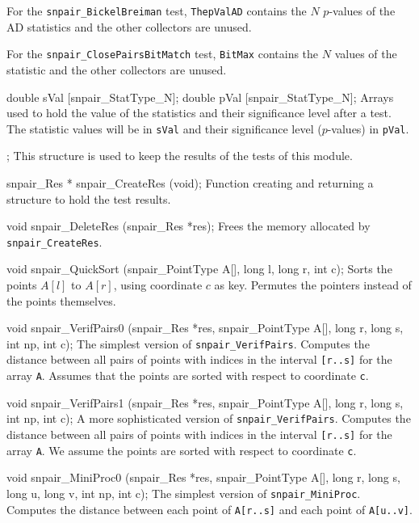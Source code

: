 {  For the {\tt snpair\_BickelBreiman} test, {\tt ThepValAD}
  contains the $N$ $p$-values of the AD statistics and the other
  collectors are unused.

  For the {\tt snpair\_ClosePairsBitMatch} test, {\tt BitMax}
  contains the $N$ values of the statistic and the other
  collectors are unused.
  \endtabb
\code

   double sVal [snpair_StatType_N];
   double pVal [snpair_StatType_N];
\endcode
 \tabb
  Arrays used to hold the value of the
  statistics and their significance level after a test.
  The statistic values will be in
  {\tt sVal} and their significance level
  ($p$-values) in {\tt pVal}.
 \endtabb
\code

};
\endcode
 \tab
  This structure is used to keep the results of
  the tests of this module.
 \endtab
\code


snpair_Res * snpair_CreateRes (void);
\endcode
 \tab
  Function creating and returning a structure to hold the test results.
 \endtab
\code


void snpair_DeleteRes (snpair_Res *res);
\endcode
 \tab
  Frees the memory allocated by {\tt snpair\_CreateRes}.
 \endtab
\fi
\hide  %

\code

void snpair_QuickSort (snpair_PointType A[], long l, long r, int c);
\endcode
 \tab Sorts the points $A[l]$ to $A[r]$, using coordinate $c$
  as key.  Permutes the pointers instead of the points themselves.
 \endtab
\code


void snpair_VerifPairs0 (snpair_Res *res, snpair_PointType A[], long r, long s,
                         int np, int c);
\endcode
 \tab The simplest version of {\tt snpair\_VerifPairs}.
  Computes the distance between all pairs of points with indices in the
  interval {\tt [r..s]} for the array {\tt A}.
  Assumes that the points are sorted with respect to coordinate {\tt c}.
\endtab
\code


void snpair_VerifPairs1 (snpair_Res *res, snpair_PointType A[], long r, long s,
                         int np, int c);
\endcode
 \tab A more sophisticated version of {\tt snpair\_VerifPairs}.
  Computes the distance between all pairs of points with indices in the
  interval {\tt [r..s]} for the array {\tt A}.
  We assume the points are sorted with respect to coordinate {\tt c}.
\endtab
\code


void snpair_MiniProc0 (snpair_Res *res, snpair_PointType A[], long r, long s,
                       long u, long v, int np, int c);
\endcode
 \tab The simplest version of {\tt snpair\_MiniProc}.
  Computes the distance between each point of {\tt A[r..s]} and each point
  of {\tt A[u..v]}.
\endtab
\code


